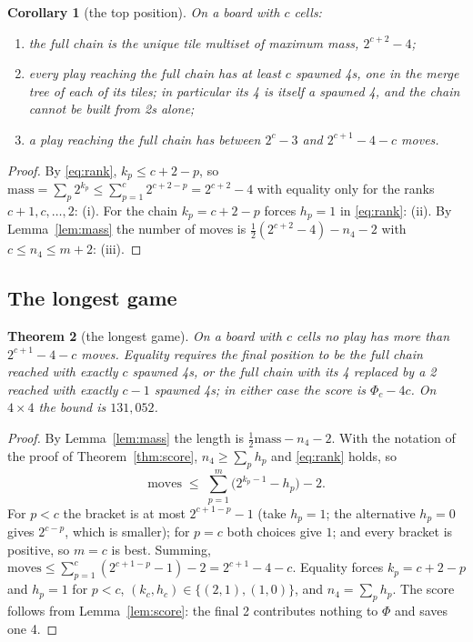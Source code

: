 \documentclass[11pt]{article}
\newtheorem{theorem}{Theorem}
\newtheorem{corollary}[theorem]{Corollary}
\theoremstyle{definition}
\theoremstyle{remark}
\newcommand{\Phichain}{\Phi}
\newcommand{\nfour}{n_4}
\newcommand{\mass}{\mathrm{mass}}
\begin{document}
\begin{corollary}[the top position]\label{cor:top}
On a board with $c$ cells:
\begin{enumerate}[nosep,label=(\roman*)]
\item the full chain is the unique tile multiset of maximum mass, $2^{c+2}-4$;
\item every play reaching the full chain has at least $c$ spawned 4s, one
in the merge tree of each of its tiles; in particular its 4 is itself a
spawned 4, and the chain cannot be built from 2s alone;
\item a play reaching the full chain has between $2^{c}-3$ and
$2^{c+1}-4-c$ moves.
\end{enumerate}
\end{corollary}
\begin{proof}
By \eqref{eq:rank}, $k_p\le c+2-p$, so $\mass=\sum_p2^{k_p}\le
\sum_{p=1}^{c}2^{c+2-p}=2^{c+2}-4$ with equality only for the ranks
$c+1,c,\dots,2$: (i). For the chain $k_p=c+2-p$ forces $h_p=1$ in
\eqref{eq:rank}: (ii). By Lemma~\ref{lem:mass} the number of moves is
$\tfrac12(2^{c+2}-4)-\nfour-2$ with $c\le\nfour\le m+2$: (iii).
\end{proof}

\subsection{The longest game}

\begin{theorem}[the longest game]\label{thm:longest}
On a board with $c$ cells no play has more than $2^{c+1}-4-c$ moves.
Equality requires the final position to be the full chain reached with
exactly $c$ spawned 4s, or the full chain with its 4 replaced by a 2
reached with exactly $c-1$ spawned 4s; in either case the score is
$\Phi_c-4c$. On $4\times4$ the bound is $131{,}052$.
\end{theorem}
\begin{proof}
By Lemma~\ref{lem:mass} the length is $\tfrac12\mass-\nfour-2$. With the
notation of the proof of Theorem~\ref{thm:score}, $\nfour\ge\sum_ph_p$ and
\eqref{eq:rank} holds, so
\[
\text{moves}\;\le\;\sum_{p=1}^{m}\bigl(2^{k_p-1}-h_p\bigr)-2 .
\]
For $p<c$ the bracket is at most $2^{c+1-p}-1$ (take $h_p=1$; the
alternative $h_p=0$ gives $2^{c-p}$, which is smaller); for $p=c$ both
choices give $1$; and every bracket is positive, so $m=c$ is best. Summing,
$\text{moves}\le\sum_{p=1}^{c}(2^{c+1-p}-1)-2=2^{c+1}-4-c$. Equality forces
$k_p=c+2-p$ and $h_p=1$ for $p<c$, $(k_c,h_c)\in\{(2,1),(1,0)\}$, and
$\nfour=\sum_ph_p$. The score follows from Lemma~\ref{lem:score}: the
final 2 contributes nothing to $\Phichain$ and saves one 4.
\end{proof}
\end{document}
